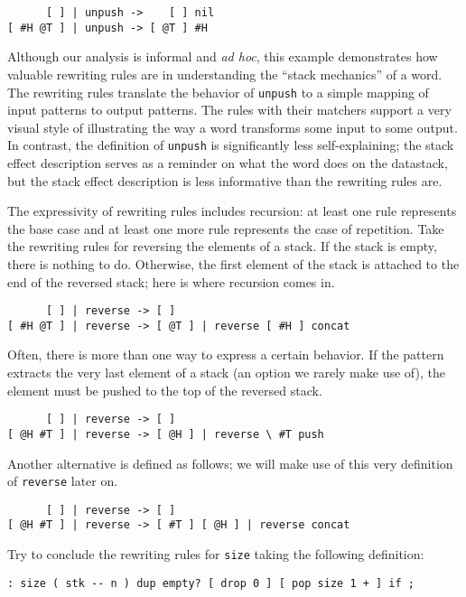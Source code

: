 \begin{verbatim}
      [ ] | unpush ->    [ ] nil
[ #H @T ] | unpush -> [ @T ] #H 
\end{verbatim}

Although our analysis is informal and \emph{ad hoc}, this example demonstrates how valuable rewriting rules are in understanding the ``stack mechanics'' of a word. The rewriting rules translate the behavior of \verb|unpush| to a simple mapping of input patterns to output patterns. The rules with their matchers support a very visual style of illustrating the way a word transforms some input to some output. In contrast, the definition of \verb|unpush| is significantly less self-explaining; the stack effect description serves as a reminder on what the word does on the datastack, but the stack effect description is less informative than the rewriting rules are.

The expressivity of rewriting rules includes recursion: at least one rule represents the base case and at least one more rule represents the case of repetition. Take the rewriting rules for reversing the elements of a stack. If the stack is empty, there is nothing to do. Otherwise, the first element of the stack is attached to the end of the reversed stack; here is where recursion comes in.

\begin{verbatim}
      [ ] | reverse -> [ ]
[ #H @T ] | reverse -> [ @T ] | reverse [ #H ] concat
\end{verbatim}

Often, there is more than one way to express a certain behavior. If the pattern extracts the very last element of a stack (an option we rarely make use of), the element must be pushed to the top of the reversed stack.

\begin{verbatim}
      [ ] | reverse -> [ ]
[ @H #T ] | reverse -> [ @H ] | reverse \ #T push
\end{verbatim}

Another alternative is defined as follows; we will make use of this very definition of \verb|reverse| later on.

\begin{verbatim}
      [ ] | reverse -> [ ]
[ @H #T ] | reverse -> [ #T ] [ @H ] | reverse concat
\end{verbatim}

\begin{exercise}\label{ex:size}
Try to conclude the rewriting rules for \verb|size| taking the following definition:
\begin{verbatim}
: size ( stk -- n ) dup empty? [ drop 0 ] [ pop size 1 + ] if ;
\end{verbatim}
\end{exercise}

